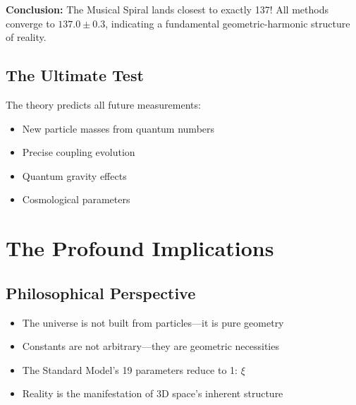 \documentclass[12pt,a4paper]{article}
\theoremstyle{definition}
\begin{document}
	\begin{table}[h]
		\centering
		\caption{Detailed analysis of different approaches}
	\end{table}
	
	\textbf{Conclusion:} The Musical Spiral lands closest to exactly 137! All methods converge to $137.0 \pm 0.3$, indicating a fundamental geometric-harmonic structure of reality.
	
	\subsection{The Ultimate Test}
	
	The theory predicts all future measurements:
	\begin{itemize}
		\item New particle masses from quantum numbers
		\item Precise coupling evolution
		\item Quantum gravity effects
		\item Cosmological parameters
	\end{itemize}
	
	\section{The Profound Implications}
	
	\subsection{Philosophical Perspective}
	
	\begin{newperspective}
		\begin{itemize}
			\item The universe is not built from particles---it is pure geometry
			\item Constants are not arbitrary---they are geometric necessities
			\item The Standard Model's 19 parameters reduce to 1: $\xi$
			\item Reality is the manifestation of 3D space's inherent structure
		\end{itemize}
	\end{newperspective}
	
\end{document}
